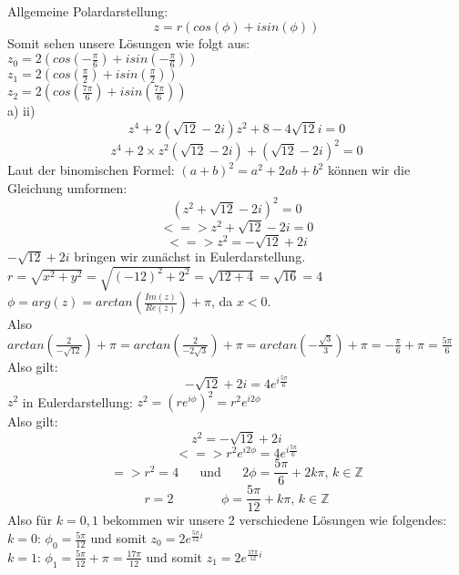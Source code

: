 \documentclass[11pt]{article}
\begin{document}
				Allgemeine Polardarstellung:\\
				$$z=r(cos(\phi)+isin(\phi))$$
\newpage
				\noindent Somit sehen unsere Lösungen wie folgt aus:\\
				\indent $z_0=2(cos\left(-\frac{\pi}{6}\right)+isin\left(-\frac{\pi}{6}\right))$\\[5pt]
				\indent $z_1=2(cos\left(\frac{\pi}{2}\right)+isin\left(\frac{\pi}{2}\right))$\\[5pt]
				\indent $z_2=2(cos\left(\frac{7\pi}{6}\right)+isin\left(\frac{7\pi}{6}\right))$\\[5pt]
			\indent a) \hspace{20pt} ii)\\
				$$z^4+2(\sqrt{12}-2i)z^2+8-4\sqrt{12}i=0$$
				$$z^4+2\times z^2(\sqrt{12}-2i)+(\sqrt{12}-2i)^2=0$$
				Laut der binomischen Formel: $(a+b)^2 = a^2+2ab+b^2$ können wir die Gleichung umformen:\\
				$$(z^2+\sqrt{12}-2i)^2=0$$
				$$<=>z^2+\sqrt{12}-2i=0$$
				$$<=>z^2=-\sqrt{12}+2i$$
				$-\sqrt{12}+2i$ bringen wir zunächst in Eulerdarstellung.\\
				$r=\sqrt{x^2+y^2}=\sqrt{(-12)^2+2^2}=\sqrt{12+4}=\sqrt{16}=4$\\
				$\phi = arg(z) = arctan\left(\frac{Im(z)}{Re(z)}\right) + \pi$, da $x<0$.\\
				\indent Also $arctan \left( \frac{2}{-\sqrt{12}}\right)+\pi = arctan\left(\frac{2}{-2\sqrt{3}}\right)+\pi = arctan \left(-\frac{\sqrt{3}}{3}\right)+\pi = -\frac{\pi}{6}+\pi = \frac{5\pi}{6}$\\
				Also gilt:
				$$-\sqrt{12}+2i=4e^{i\frac{5\pi}{6}}$$
				$z^2$ in Eulerdarstellung: $z^2=(re^{i\phi})^2=r^2e^{i2\phi}$\\
				Also gilt:\\
				$$z^2=-\sqrt{12}+2i$$
				$$<=>r^2e^{i2\phi}=4e^{i\frac{5\pi}{6}}$$
				$$=> r^2 =4 \hspace{20pt} \mbox{und} \hspace{20pt} 2\phi = \frac{5\pi}{6}+2k\pi \mbox{, } k\in\mathbb{Z}$$
				$$r=2 \hspace{45pt} \phi = \frac{5\pi}{12}+k\pi \mbox{, } k\in\mathbb{Z}$$
				Also für $k=0,1$ bekommen wir unsere 2 verschiedene Lösungen wie folgendes:\\
				\indent $k=0$: \hspace{10pt} $\phi _0 = \frac{5\pi}{12}$ und somit $z_0= 2e^{\frac{5\pi}{12}i}$\\
				\indent $k=1$: \hspace{10pt} $\phi _1 = \frac{5\pi}{12} + \pi = \frac{17\pi}{12}$ und somit $z_1=2e^{\frac{17\pi}{12}i}$\\
\end{document}
